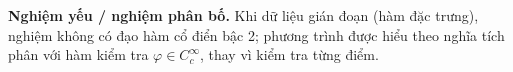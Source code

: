 \textbf{Nghiệm yếu / nghiệm phân bố.}
Khi dữ liệu gián đoạn (hàm đặc trưng), nghiệm không có đạo hàm cổ điển bậc 2; phương trình được hiểu theo nghĩa tích phân với hàm kiểm tra $\varphi\in C_c^\infty$, thay vì kiểm tra từng điểm.
